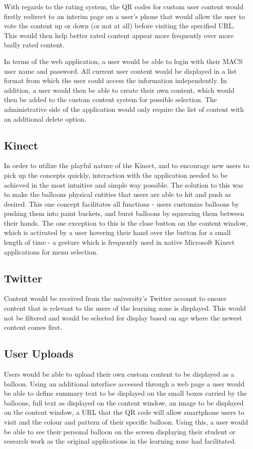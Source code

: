 With regards to the rating system, the QR codes for custom user content would firstly redirect to an interim page on a user's phone that would allow the user to vote the content up or down (or not at all) before visiting the specified URL. This would then help better rated content appear more frequently over more badly rated content.

In terms of the web application, a user would be able to login with their MACS user name and password. All current user content would be displayed in a list format from which the user could access the information independently. In addition, a user would then be able to create their own content, which would then be added to the custom content system for possible selection. The administrative side of the application would only require the list of content with an additional delete option.

\subsection{Kinect}
In order to utilize the playful nature of the Kinect, and to encourage new users to pick up the concepts quickly, interaction with the application needed to be achieved in the most intuitive and simple way possible. The solution to this was to make the balloons physical entities that users are able to hit and push as desired. This one concept facilitates all functions - users customize balloons by pushing them into paint buckets, and burst balloons by squeezing them between their hands. The one exception to this is the close button on the content window, which is activated by a user hovering their hand over the button for a small length of time - a gesture which is frequently used in native Microsoft Kinect applications for menu selection.

\subsection{Twitter}
Content would be received from the university's Twitter account to ensure content that is relevant to the users of the learning zone is displayed. This would not be filtered and would be selected for display based on age where the newest content comes first.

\subsection{User Uploads}
Users would be able to upload their own custom content to be displayed as a balloon. Using an additional interface accessed through a web page a user would be able to define summary text to be displayed on the small boxes carried by the balloons, full text as displayed on the content window, an image to be displayed on the content window, a URL that the QR code will allow smartphone users to visit and the colour and pattern of their specific balloon. Using this, a user would be able to see their personal balloon on the screen displaying their student or research work as the original applications in the learning zone had facilitated.

